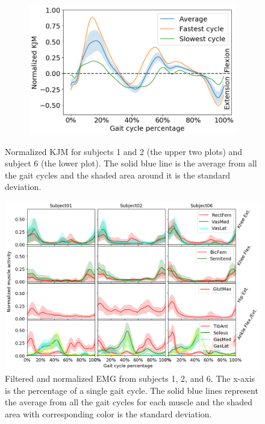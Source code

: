 \documentclass[../main.tex]{subfiles}
\begin{document}
\begin{figure}[ht!]
\begin{subfigure}[b]{0.49\textwidth}
         \includegraphics[width=\textwidth]{img/results/moment_avg/subject06_all_set1_moment_avg_w_minmax.png}
     \end{subfigure}
    \caption{Normalized \ac{KJM} for subjects 1 and 2 (the upper two plots) and subject 6 (the lower plot). The solid blue line is the average from all the gait cycles and the shaded area around it is the standard deviation.}
    \label{fig:kjm-average}
\end{figure}
\begin{figure}[ht!]
    \centering
    \includegraphics[width=\textwidth]{img/results/emg_avg/all_subject_grid_emg_avg.png}
    \caption{Filtered and normalized \ac{EMG} from subjects 1, 2, and 6. The x-axis is the percentage of a single gait cycle. The solid blue lines represent the average from all the gait cycles for each muscle and the shaded area with corresponding color is the standard deviation.}
    \label{fig:emg-average}
\end{figure}
\end{document}
